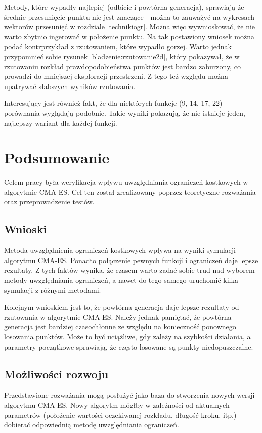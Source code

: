 \documentclass{mini}
\begin{document}
Metody, które wypadły najlepiej (odbicie i powtórna generacja), sprawiają że średnie przesunięcie punktu nie jest znaczące - można to zauważyć na wykresach wektorów przesunięć w rozdziale \ref{technikiogr}. Można więc wywnioskować, że nie warto zbytnio ingerować w położenie punktu. Na tak postawiony wniosek można podać kontrprzykład z rzutowaniem, które wypadło gorzej. Warto jednak przypomnieć sobie rysunek \ref{bladzenie:rzutowanie2d}, który pokazywał, że w rzutowaniu rozkład prawdopodobieństwa punktów jest bardzo zaburzony, co prowadzi do mniejszej eksploracji przestrzeni. Z tego też względu można upatrywać słabszych wyników rzutowania.

Interesujący jest również fakt, że dla niektórych funkcje (9, 14, 17, 22) porównania wyglądają podobnie. Takie wyniki pokazują, że nie istnieje jeden, najlepszy wariant dla każdej funkcji.


\pagebreak

\section{Podsumowanie}
\hspace{3,4ex}Celem pracy była weryfikacja wpływu uwzględniania ograniczeń kostkowych w algorytmie CMA-ES. Cel ten został zrealizowany poprzez teoretyczne rozważania oraz przeprowadzenie testów.

\subsection{Wnioski}
\hspace{3,4ex}Metoda uwzględnienia ograniczeń kostkowych wpływa na wyniki symulacji algorytmu CMA-ES. Ponadto połączenie pewnych funkcji i ograniczeń daje lepsze rezultaty. Z tych faktów wynika, że czasem warto zadać sobie trud nad wyborem metody uwzględniania ograniczeń, a nawet do tego samego uruchomić kilka symulacji z różnymi metodami.

Kolejnym wnioskiem jest to, że powtórna generacja daje lepsze rezultaty od rzutowania w algorytmie CMA-ES. Należy jednak pamiętać, że powtórna generacja jest bardziej czasochłonne ze względu na konieczność ponownego losowania punktów. Może to być uciążliwe, gdy zależy na szybkości działania, a parametry początkowe sprawiają, że często losowane są punkty niedopuszczalne.

\subsection{Możliwości rozwoju}
\hspace{3,4ex}Przedstawione rozważania mogą posłużyć jako baza do stworzenia nowych wersji algorytmu CMA-ES. Nowy algorytm mógłby w zależności od aktualnych parametrów (położenie wartości oczekiwanej rozkładu, długość kroku, itp.) dobierać odpowiednią metodę uwzględniania ograniczeń.
\end{document}
